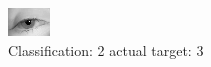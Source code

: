 \begin{figure}[h!]
\begin{center}
\includegraphics[width=0.60\columnwidth]{figures/ID2878_class_2_target_3.png}
\end{center}
\caption{ Classification: 2 actual target: 3}
\label{fig:ID2878_class_2_target_3}
\end{figure}
